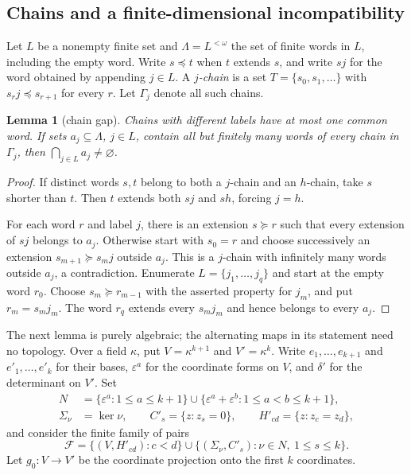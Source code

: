 \documentclass[11pt]{amsart}
\newtheorem{lemma}[theorem]{Lemma}
\theoremstyle{definition}
\theoremstyle{remark}
\numberwithin{equation}{section}
\begin{document}
\subsection{Chains and a finite-dimensional incompatibility}

Let $L$ be a nonempty finite set and $\Lambda=L^{<\omega}$ the set of finite words in $L$, including the
empty word. Write $s\preceq t$ when $t$ extends $s$, and write $sj$ for the word obtained by appending
$j\in L$. A \emph{$j$-chain} is a set $T=\{s_0,s_1,\dots\}$ with $s_rj\preceq s_{r+1}$ for every $r$.
Let $\Gamma_j$ denote all such chains.

\begin{lemma}[chain gap]\label{scalar:gap}
Chains with different labels have at most one common word. If sets $a_j\subseteq\Lambda$, $j\in L$,
contain all but finitely many words of every chain in $\Gamma_j$, then $\bigcap_{j\in L}a_j\ne\varnothing$.
\end{lemma}

\begin{proof}
If distinct words $s,t$ belong to both a $j$-chain and an $h$-chain, take $s$ shorter than $t$.
Then $t$ extends both $sj$ and $sh$, forcing $j=h$.

For each word $r$ and label $j$, there is an extension $s\succeq r$ such that every extension of $sj$
belongs to $a_j$. Otherwise start with $s_0=r$ and choose successively an extension
$s_{m+1}\succeq s_mj$ outside $a_j$. This is a $j$-chain with infinitely many words outside $a_j$,
a contradiction. Enumerate $L=\{j_1,\dots,j_q\}$ and start at the empty word $r_0$. Choose $s_m\succeq
r_{m-1}$ with the asserted property for $j_m$, and put $r_m=s_mj_m$. The word $r_q$ extends every
$s_mj_m$ and hence belongs to every $a_j$.
\end{proof}

The next lemma is purely algebraic; the alternating maps in its statement need no topology.
Over a field $\kappa$, put $V=\kappa^{k+1}$ and $V'=\kappa^k$. Write $e_1,\dots,e_{k+1}$ and
$e'_1,\dots,e'_k$ for their bases, $\varepsilon^a$ for the coordinate forms on $V$, and $\delta'$ for the
determinant on $V'$. Set
\begin{align*}
 N&=\{\varepsilon^a:1\le a\le k+1\}
       \cup\{\varepsilon^a+\varepsilon^b:1\le a<b\le k+1\},\\
 \Sigma_\nu&=\ker\nu,\qquad C'_s=\{z:z_s=0\},\qquad H'_{cd}=\{z:z_c=z_d\},
\end{align*}
and consider the finite family of pairs
\begin{equation}\label{scalar:family}
 \mathcal F=\{(V,H'_{cd}):c<d\}
 \cup\{(\Sigma_\nu,C'_s):\nu\in N,\ 1\le s\le k\}.
\end{equation}
Let $g_0\colon V\to V'$ be the coordinate projection onto the first $k$ coordinates.
\end{document}
